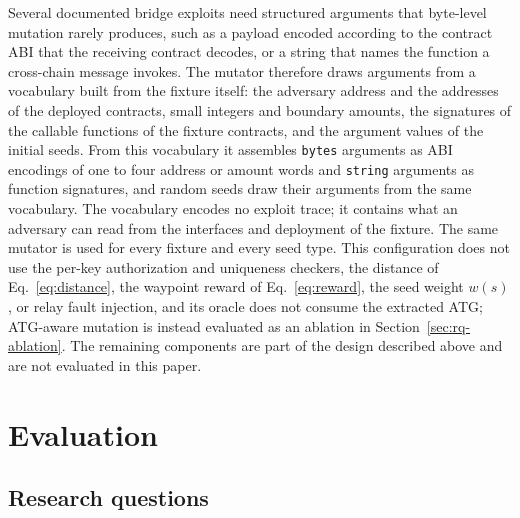 \documentclass[a4paper]{cas-sc}
\begin{document}
Several documented bridge exploits need structured arguments that byte-level mutation rarely produces, such as a payload encoded according to the contract ABI that the receiving contract decodes, or a string that names the function a cross-chain message invokes. The mutator therefore draws arguments from a vocabulary built from the fixture itself: the adversary address and the addresses of the deployed contracts, small integers and boundary amounts, the signatures of the callable functions of the fixture contracts, and the argument values of the initial seeds. From this vocabulary it assembles \texttt{bytes} arguments as ABI encodings of one to four address or amount words and \texttt{string} arguments as function signatures, and random seeds draw their arguments from the same vocabulary. The vocabulary encodes no exploit trace; it contains what an adversary can read from the interfaces and deployment of the fixture. The same mutator is used for every fixture and every seed type.
This configuration does not use the per-key authorization and uniqueness checkers, the distance of Eq.~\eqref{eq:distance}, the waypoint reward of Eq.~\eqref{eq:reward}, the seed weight $w(s)$, or relay fault injection, and its oracle does not consume the extracted ATG; ATG-aware mutation is instead evaluated as an ablation in Section~\ref{sec:rq-ablation}. The remaining components are part of the design described above and are not evaluated in this paper.

\section{Evaluation}\label{sec:experiments}

\subsection{Research questions}
\end{document}
